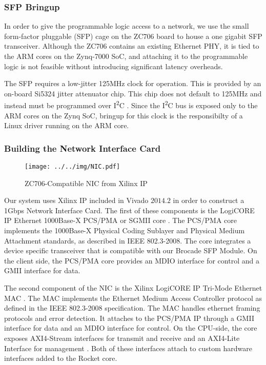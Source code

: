 \subsubsection {SFP Bringup}
    In order to give the programmable logic access to a network, we use 
    the small form-factor pluggable (SFP) cage on the ZC706 board to house a 
    one gigabit SFP transceiver. Although the ZC706 contains an existing Ethernet
    PHY, it is tied to the ARM cores on the Zynq-7000 SoC, and attaching it to 
    the programmable logic is not feasible without introducing significant 
    latency overheads.

    The SFP requires a low-jitter 125MHz clock for operation. This is provided
    by an on-board Si5324 jitter attenuator chip. This chip does not default to 
    125MHz and instead must be programmed over I\textsuperscript{2}C \cite{xapp1082}. Since the I\textsuperscript{2}C bus is exposed
    only to the ARM cores on the Zynq SoC, bringup for this clock is the 
    responsibilty of a Linux driver running on the ARM core.

\subsubsection{Building the Network Interface Card}

\begin{figure}[t]
\begin{center}
\label{fig:nic}
\texttt{[image: ../../img/NIC.pdf]}
\caption{ZC706-Compatible NIC from Xilinx IP}
\end{center}
\end{figure}

    Our system uses Xilinx IP included in Vivado $2014.2$ in order to construct 
    a 1Gbps Network Interface Card. The first of these components is the LogiCORE
    IP Ethernet 1000Base-X PCS/PMA or SGMII core \cite{pcspma}. The PCS/PMA
    core implements the 1000Base-X Physical Coding Sublayer and Physical Medium
    Attachment standards, as described in IEEE 802.3-2008. The core integrates
    a device specific transceiver that is compatible with our Brocade SFP Module.
    On the client side, the PCS/PMA core provides an MDIO interface for control
    and a GMII interface for data.

    The second component of the NIC is the Xilinx LogiCORE IP Tri-Mode Ethernet 
    MAC \cite{trimac}. The MAC implements the Ethernet Medium Access Controller
    protocol as defined in the IEEE 802.3-2008 specification. The MAC handles
    ethernet framing protocols and error detection. It attaches to the PCS/PMA
    IP through a GMII interface for data and an MDIO interface for control.
    On the CPU-side, the core exposes AXI4-Stream interfaces for transmit and 
    receive and an AXI4-Lite Interface for management \cite{axi}. Both of these
    interfaces attach to custom hardware interfaces added to the Rocket core.


